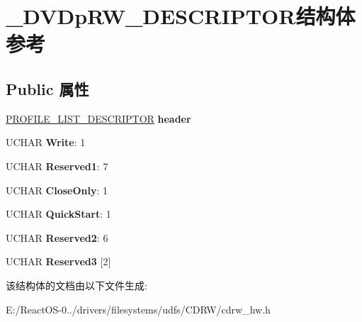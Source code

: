 \hypertarget{struct___d_v_dp_r_w___d_e_s_c_r_i_p_t_o_r}{}\section{\+\_\+\+D\+V\+Dp\+R\+W\+\_\+\+D\+E\+S\+C\+R\+I\+P\+T\+O\+R结构体 参考}
\label{struct___d_v_dp_r_w___d_e_s_c_r_i_p_t_o_r}
\subsection*{Public 属性}
\begin{DoxyCompactItemize}
\item 
\mbox{\label{struct___d_v_dp_r_w___d_e_s_c_r_i_p_t_o_r_aa9a5ecc9a8bd5def3730442d2559212f}} 
\hyperlink{struct___p_r_o_f_i_l_e___l_i_s_t___d_e_s_c_r_i_p_t_o_r}{P\+R\+O\+F\+I\+L\+E\+\_\+\+L\+I\+S\+T\+\_\+\+D\+E\+S\+C\+R\+I\+P\+T\+OR} {\bfseries header}
\item 
\mbox{\label{struct___d_v_dp_r_w___d_e_s_c_r_i_p_t_o_r_ae61f074f617d41d02fa7768cff728a2d}} 
U\+C\+H\+AR {\bfseries Write}\+: 1
\item 
\mbox{\label{struct___d_v_dp_r_w___d_e_s_c_r_i_p_t_o_r_ad942f6dc15e121a271693e9b35e26fd7}} 
U\+C\+H\+AR {\bfseries Reserved1}\+: 7
\item 
\mbox{\label{struct___d_v_dp_r_w___d_e_s_c_r_i_p_t_o_r_aecd36958c0d06f838a53dd4c71164dca}} 
U\+C\+H\+AR {\bfseries Close\+Only}\+: 1
\item 
\mbox{\label{struct___d_v_dp_r_w___d_e_s_c_r_i_p_t_o_r_afadad79b8969bed713aa57cbb804a2e2}} 
U\+C\+H\+AR {\bfseries Quick\+Start}\+: 1
\item 
\mbox{\label{struct___d_v_dp_r_w___d_e_s_c_r_i_p_t_o_r_a99acf6f851f80f160f0e49ea2481f678}} 
U\+C\+H\+AR {\bfseries Reserved2}\+: 6
\item 
\mbox{\label{struct___d_v_dp_r_w___d_e_s_c_r_i_p_t_o_r_aaaeb9305181fc7e59dd309ffcefe60f4}} 
U\+C\+H\+AR {\bfseries Reserved3} \mbox{[}2\mbox{]}
\end{DoxyCompactItemize}


该结构体的文档由以下文件生成\+:\begin{DoxyCompactItemize}
\item 
E\+:/\+React\+O\+S-\/0../drivers/filesystems/udfs/\+C\+D\+R\+W/cdrw\+\_\+hw.\+h\end{DoxyCompactItemize}

